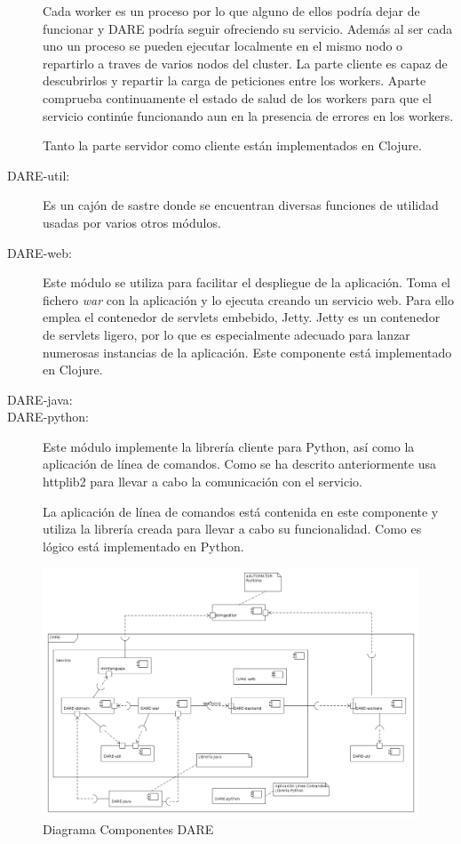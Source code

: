 \begin{description}
  Cada worker es un proceso por lo que alguno de ellos podría dejar de
  funcionar y DARE podría seguir ofreciendo su servicio. Además al ser
  cada uno un proceso se pueden ejecutar localmente en el mismo nodo o
  repartirlo a traves de varios nodos del cluster. La parte cliente es
  capaz de descubrirlos y repartir la carga de peticiones entre los
  workers. Aparte comprueba continuamente el estado de salud de los
  workers para que el servicio continúe funcionando aun en la
  presencia de errores en los workers.

 Tanto la parte servidor como cliente están implementados en Clojure.

\item[DARE-util:] Es un cajón de sastre donde se encuentran diversas
  funciones de utilidad usadas por varios otros módulos.

\item[DARE-web:] Este módulo se utiliza para facilitar el despliegue
  de la aplicación. Toma el fichero \emph{war} con la aplicación y lo
  ejecuta creando un servicio web. Para ello emplea el contenedor de
  servlets embebido, Jetty\cite{JETTY}. Jetty es un contenedor de
  servlets ligero, por lo que es especialmente adecuado para lanzar
  numerosas instancias de la aplicación. Este componente está
  implementado en Clojure.

\item[DARE-java:] %
\item[DARE-python:] Este módulo implemente la librería cliente para
  Python, así como la aplicación de línea de comandos. Como se ha
  descrito anteriormente usa httplib2 para llevar a cabo la
  comunicación con el servicio.

  La aplicación de línea de comandos está contenida en este componente
  y utiliza la librería creada para llevar a cabo su
  funcionalidad. Como es lógico está implementado en Python.
\end{description}

\begin{landscape}
\begin{figure}[p]
\includegraphics[width=1.4\textwidth]{chapters/technical-manual/diagrams/diagrama_componentes.png}
\caption{Diagrama Componentes DARE}\label{diagrama_componentes_dare}
\end{figure}
\end{landscape}


